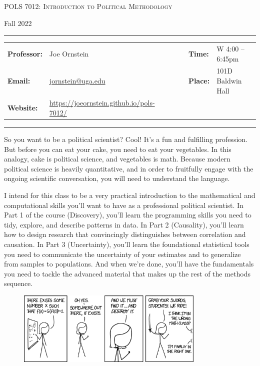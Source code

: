 \documentclass[11pt, letterpaper]{article}
\begin{document}
\begin{center}
{\Large \textsc{POLS 7012: Introduction to Political Methodology}}
\end{center}
\begin{center}
{\large Fall 2022}
\end{center}

\begin{center}
\rule{6.5in}{0.4pt}
\begin{minipage}[t]{.96\textwidth}
\begin{tabular}{llcccll}
\textbf{Professor:} & Joe Ornstein & & &  & \textbf{Time:} & W 4:00 -- 6:45pm \\
\textbf{Email:} &  \href{mailto:jornstein@uga.edu}{jornstein@uga.edu} & & & & \textbf{Place:} & 101D Baldwin Hall\\
\textbf{Website:} & \href{https://joeornstein.github.io/pols-7012/}{https://joeornstein.github.io/pols-7012/} & & & & &
\end{tabular}
\end{minipage}
\rule{6.5in}{0.4pt}
\end{center}
\vspace{.15cm}
\setlength{\unitlength}{1in}
\renewcommand{\arraystretch}{2}


\noindent So you want to be a political scientist? Cool! It's a fun and fulfilling profession. But before you can eat your cake, you need to eat your vegetables. In this analogy, cake is political science, and vegetables is math. Because modern political science is heavily quantitative, and in order to fruitfully engage with the ongoing scientific conversation, you will need to understand the language. 

I intend for this class to be a very practical introduction to the mathematical and computational skills you'll want to have as a professional political scientist. In Part 1 of the course (Discovery), you'll learn the programming skills you need to tidy, explore, and describe patterns in data. In Part 2 (Causality), you'll learn how to design research that convincingly distinguishes between correlation and causation. In Part 3 (Uncertainty), you'll learn the foundational statistical tools you need to communicate the uncertainty of your estimates and to generalize from samples to populations. And when we're done, you'll have the fundamentals you need to tackle the advanced material that makes up the rest of the methods sequence. 

\begin{figure}[h]
	\centering
	\href{https://xkcd.com/1856/}{\includegraphics[width=0.8\textwidth]{img/existence_proof_2x.png}}
\end{figure}
\end{document}
